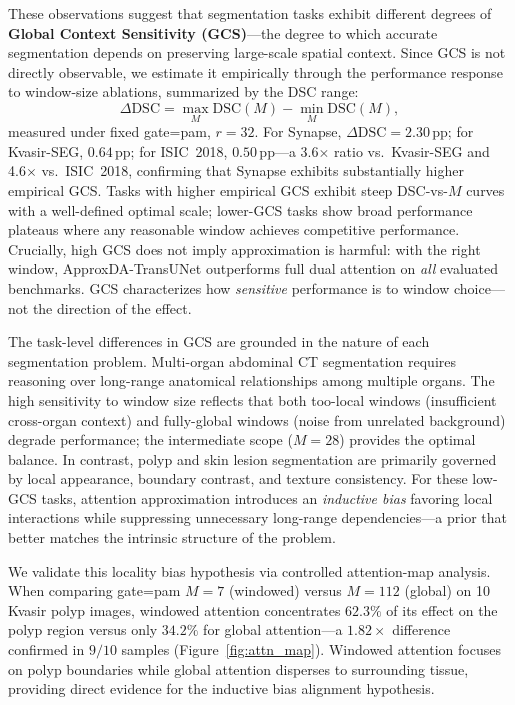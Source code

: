 These observations suggest that segmentation tasks exhibit different degrees of \textbf{Global Context Sensitivity (GCS)}---the degree to which accurate segmentation depends on preserving large-scale spatial context. Since GCS is not directly observable, we estimate it empirically through the performance response to window-size ablations, summarized by the DSC range:
\[
  \Delta\text{DSC} = \max_{M} \text{DSC}(M) - \min_{M} \text{DSC}(M),
\]
measured under fixed gate=pam, $r{=}32$. For Synapse, $\Delta\text{DSC} = 2.30$\,pp; for Kvasir-SEG, $0.64$\,pp; for ISIC~2018, $0.50$\,pp---a 3.6$\times$ ratio vs.\ Kvasir-SEG and 4.6$\times$ vs.\ ISIC~2018, confirming that Synapse exhibits substantially higher empirical GCS. Tasks with higher empirical GCS exhibit steep DSC-vs-$M$ curves with a well-defined optimal scale; lower-GCS tasks show broad performance plateaus where any reasonable window achieves competitive performance. Crucially, high GCS does not imply approximation is harmful: with the right window, ApproxDA-TransUNet outperforms full dual attention on \emph{all} evaluated benchmarks. GCS characterizes how \emph{sensitive} performance is to window choice---not the direction of the effect.

The task-level differences in GCS are grounded in the nature of each segmentation problem. Multi-organ abdominal CT segmentation requires reasoning over long-range anatomical relationships among multiple organs. The high sensitivity to window size reflects that both too-local windows (insufficient cross-organ context) and fully-global windows (noise from unrelated background) degrade performance; the intermediate scope ($M{=}28$) provides the optimal balance. In contrast, polyp and skin lesion segmentation are primarily governed by local appearance, boundary contrast, and texture consistency. For these low-GCS tasks, attention approximation introduces an \emph{inductive bias} favoring local interactions while suppressing unnecessary long-range dependencies---a prior that better matches the intrinsic structure of the problem.

We validate this locality bias hypothesis via controlled attention-map analysis. When comparing gate=pam $M{=}7$ (windowed) versus $M{=}112$ (global) on 10 Kvasir polyp images, windowed attention concentrates $62.3\%$ of its effect on the polyp region versus only $34.2\%$ for global attention---a $1.82{\times}$ difference confirmed in $9/10$ samples (Figure~\ref{fig:attn_map}). Windowed attention focuses on polyp boundaries while global attention disperses to surrounding tissue, providing direct evidence for the inductive bias alignment hypothesis.

